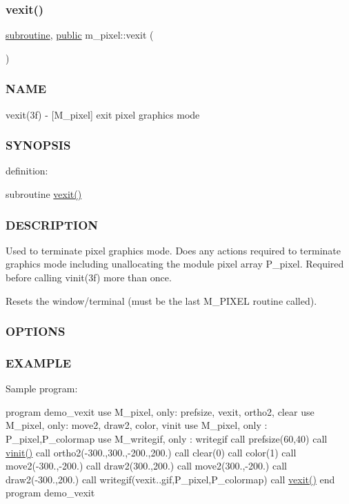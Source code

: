 \subsubsection{\texorpdfstring{vexit()}{vexit()}}
{\footnotesize\ttfamily \hyperlink{M__stopwatch_83_8txt_acfbcff50169d691ff02d4a123ed70482}{subroutine}, \hyperlink{M__stopwatch_83_8txt_a2f74811300c361e53b430611a7d1769f}{public} m\+\_\+pixel\+::vexit (\begin{DoxyParamCaption}{ }\end{DoxyParamCaption})}



\subsubsection*{N\+A\+ME}

vexit(3f) -\/ \mbox{[}M\+\_\+pixel\mbox{]} exit pixel graphics mode 

\subsubsection*{S\+Y\+N\+O\+P\+S\+IS}

definition\+:

subroutine \hyperlink{namespacem__pixel_a19ad6b65752322b0029a62cc0ebec3e8}{vexit()}

\subsubsection*{D\+E\+S\+C\+R\+I\+P\+T\+I\+ON}

Used to terminate pixel graphics mode. Does any actions required to terminate graphics mode including unallocating the module pixel array P\+\_\+pixel. Required before calling vinit(3f) more than once.

Resets the window/terminal (must be the last M\+\_\+\+P\+I\+X\+EL routine called).

\subsubsection*{O\+P\+T\+I\+O\+NS}

\subsubsection*{E\+X\+A\+M\+P\+LE}

Sample program\+:

program demo\+\_\+vexit use M\+\_\+pixel, only\+: prefsize, vexit, ortho2, clear use M\+\_\+pixel, only\+: move2, draw2, color, vinit use M\+\_\+pixel, only \+: P\+\_\+pixel,P\+\_\+colormap use M\+\_\+writegif, only \+: writegif call prefsize(60,40) call \hyperlink{namespacem__pixel_ac03ca8f23fdadb60599b6ea4dc87a6d9}{vinit()} call ortho2(-\/300.,300.,-\/200.,200.) call clear(0) call color(1) call move2(-\/300.,-\/200.) call draw2(300.,200.) call move2(300.,-\/200.) call draw2(-\/300.,200.) call writegif(\textquotesingle{}vexit..\+gif\textquotesingle{},P\+\_\+pixel,P\+\_\+colormap) call \hyperlink{namespacem__pixel_a19ad6b65752322b0029a62cc0ebec3e8}{vexit()} end program demo\+\_\+vexit 

